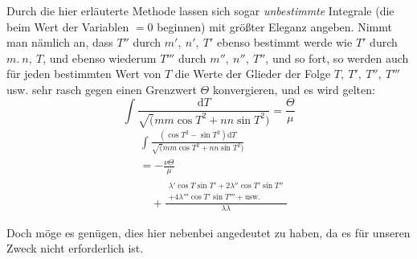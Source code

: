 \begingroup
\renewcommand{\arraystretch}{1.45}
Durch die hier erläuterte Methode lassen sich sogar \textit{unbestimmte} Integrale (die beim Wert der Variablen $=0$ beginnen) mit größter Eleganz angeben. Nimmt man nämlich an, dass $T''$ durch $m',\ n',\ T'$ ebenso bestimmt werde wie $T'$ durch $m.\ n,\ T$, und ebenso wiederum $T'''$ durch $m'',\ n'',\ T''$, und so fort, so werden auch für jeden bestimmten Wert von $T$ die Werte der Glieder der Folge $T,\ T',\ T'',\ T'''$ usw. sehr rasch gegen einen Grenzwert $\Theta$ konvergieren, und es wird gelten:
\[
\int\frac{\mathrm{d}T}{\surd(mm\cos T^2+nn\sin T^2)}=\frac{\Theta}{\mu}
\]
\[
\begin{aligned}&\int\frac{(\cos T^2-\sin T^2)\mathrm{d}T}{\surd(mm\cos T^2+nn\sin T^2)}\\[7pt]&=-\frac{\nu\Theta}{\mu}\\[7pt]&\quad+\frac{\begin{gathered}\lambda'\cos T\sin T'+2\lambda''\cos T'\sin T''\\+4\lambda'''\cos T'\sin T'''+\mathrm{usw.}\end{gathered}}{\lambda\lambda}\end{aligned}
\]
\par Doch möge es genügen, dies hier nebenbei angedeutet zu haben, da es für unseren Zweck nicht erforderlich ist.

